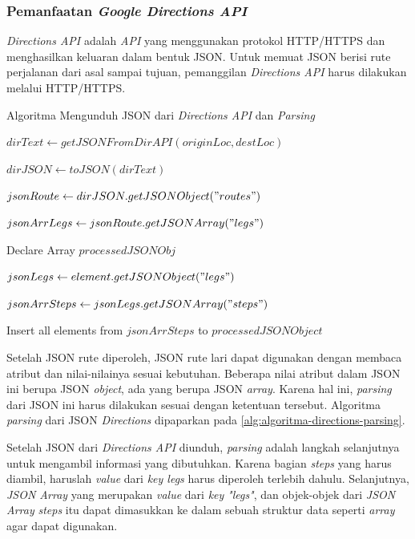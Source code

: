 \subsubsection{Pemanfaatan \textit{Google Directions API}}
\textit{Directions API} adalah \textit{API} yang menggunakan protokol HTTP/HTTPS dan menghasilkan keluaran dalam bentuk JSON. Untuk memuat JSON berisi rute perjalanan dari asal sampai tujuan, pemanggilan \textit{Directions API} harus dilakukan melalui HTTP/HTTPS.

\begin{algorithm}
	\caption{Algoritma Mengunduh JSON dari \textit{Directions API} dan \textit{Parsing}}
	\label{alg:algoritma-directions-parsing}
	\begin{algorithmic}[1]
		\State $dirText \gets getJSONFromDirAPI(originLoc,destLoc)$ 
		
		\State $dirJSON \gets toJSON(dirText)$	
		
		\State $jsonRoute \gets dirJSON.getJSONObject("routes")$
		
		\State $jsonArrLegs \gets jsonRoute.getJSONArray("legs")$

		\State Declare Array $processedJSONObj$		
		
		\State $jsonLegs \gets element.getJSONObject("legs") $

		\State $jsonArrSteps \gets jsonLegs.getJSONArray("steps")$		
		
		\State Insert all elements from $jsonArrSteps$ to $processedJSONObject$ 
		\EndFor
	\EndFunction  
	\end{algorithmic}
\end{algorithm}

Setelah JSON rute diperoleh, JSON rute lari dapat digunakan dengan membaca atribut dan nilai-nilainya sesuai kebutuhan. Beberapa nilai atribut dalam JSON ini  berupa JSON \textit{object}, ada yang berupa JSON \textit{array}. Karena hal ini,  \textit{parsing} dari JSON ini harus dilakukan sesuai dengan ketentuan tersebut. Algoritma \textit{parsing} dari JSON \textit{Directions} dipaparkan pada \ref{alg:algoritma-directions-parsing}. 

Setelah JSON dari \textit{Directions API} diunduh, \textit{parsing} adalah langkah selanjutnya untuk mengambil informasi yang dibutuhkan. Karena bagian \textit{steps} yang harus diambil, haruslah \textit{value} dari \textit{key legs} harus diperoleh terlebih dahulu. Selanjutnya, \textit{JSON Array} yang merupakan \textit{value} dari \textit{key} \textit{"legs"}, dan objek-objek dari \textit{JSON Array} \textit{steps} itu dapat dimasukkan ke dalam sebuah struktur data seperti \textit{array} agar dapat digunakan.  

